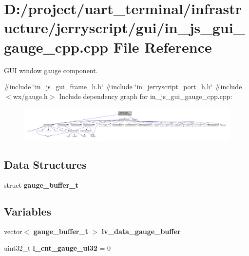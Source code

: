 \section{D\+:/project/uart\+\_\+terminal/infrastructure/jerryscript/gui/in\+\_\+js\+\_\+gui\+\_\+gauge\+\_\+cpp.cpp File Reference}
\label{in__js__gui__gauge__cpp_8cpp}


G\+UI window gauge component.  


{\ttfamily \#include \char`\"{}in\+\_\+js\+\_\+gui\+\_\+frame\+\_\+h.\+h\char`\"{}}\newline
{\ttfamily \#include \char`\"{}in\+\_\+jerryscript\+\_\+port\+\_\+h.\+h\char`\"{}}\newline
{\ttfamily \#include $<$wx/gauge.\+h$>$}\newline
Include dependency graph for in\+\_\+js\+\_\+gui\+\_\+gauge\+\_\+cpp.\+cpp\+:\nopagebreak
\begin{figure}[H]
\begin{center}
\leavevmode
\includegraphics[width=350pt]{in__js__gui__gauge__cpp_8cpp__incl}
\end{center}
\end{figure}
\subsection*{Data Structures}
\begin{DoxyCompactItemize}
\item 
struct \textbf{ gauge\+\_\+buffer\+\_\+t}
\end{DoxyCompactItemize}
\subsection*{Variables}
\begin{DoxyCompactItemize}
\item 
vector$<$ \textbf{ gauge\+\_\+buffer\+\_\+t} $>$ \textbf{ lv\+\_\+data\+\_\+gauge\+\_\+buffer}
\item 
uint32\+\_\+t {\bfseries l\+\_\+cnt\+\_\+gauge\+\_\+ui32} = 0
\end{DoxyCompactItemize}


